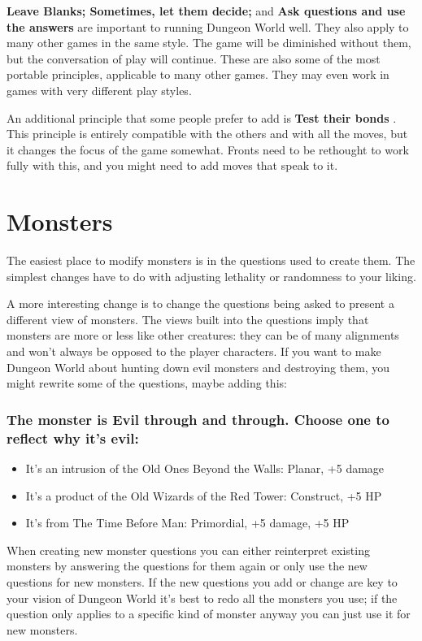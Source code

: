  \textbf{Leave Blanks; Sometimes, let them decide;}
 and \textbf{Ask questions and use the answers}
 are important to running Dungeon World well. They also apply to many other games in the same style. The game will be diminished without them, but the conversation of play will continue. These are also some of the most portable principles, applicable to many other games. They may even work in games with very different play styles.


 An additional principle that some people prefer to add is \textbf{Test their bonds}
. This principle is entirely compatible with the others and with all the moves, but it changes the focus of the game somewhat. Fronts need to be rethought to work fully with this, and you might need to add moves that speak to it.
\section{Monsters}


 The easiest place to modify monsters is in the questions used to create them. The simplest changes have to do with adjusting lethality or randomness to your liking.


 A more interesting change is to change the questions being asked to present a different view of monsters. The views built into the questions imply that monsters are more or less like other creatures: they can be of many alignments and won't always be opposed to the player characters. If you want to make Dungeon World about hunting down evil monsters and destroying them, you might rewrite some of the questions, maybe adding this:
\subsubsection{The monster is Evil through and through. Choose one to reflect why it's evil:}
\begin{itemize}
\item It's an intrusion of the Old Ones Beyond the Walls: Planar, +5 damage
\item It's a product of the Old Wizards of the Red Tower: Construct, +5 HP
\item It's from The Time Before Man: Primordial, +5 damage, +5 HP

\end{itemize}


 When creating new monster questions you can either reinterpret existing monsters by answering the questions for them again or only use the new questions for new monsters. If the new questions you add or change are key to your vision of Dungeon World it's best to redo all the monsters you use; if the question only applies to a specific kind of monster anyway you can just use it for new monsters.


